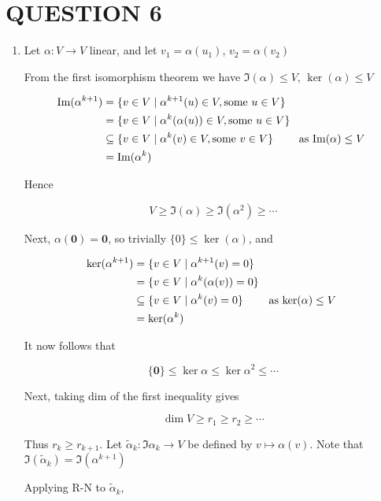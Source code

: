 \documentclass[a4paper]{article}
\begin{document}
	
	\section{QUESTION 6}
	
	
\begin{enumerate}
	\item Let $ \alpha : V \to V $ linear, and let $ v_{1} = \alpha(u_{1}) $, $ v_{2} = \alpha(v_{2}) $

From the first isomorphism theorem we have $ \Im(\alpha) \leq V $,
$ \ker	(\alpha) \leq V $


\begin{align*}
\Im (\alpha^{k+1}) & = \{  v \in V \; | \; \alpha^{k+1}(u) \in V, \text{some } u \in V \} \\
& = \{  v \in V \; | \; \alpha^{k}(\alpha(u)) \in V, \text{some } u \in V \}\\
& \subseteq \{  v \in V \; | \; \alpha^{k}(v) \in V, \text{some } v \in V \}  \qquad \text{ as $ \Im(\alpha) \leq V $ } \\
& = \Im(\alpha^{k})
\end{align*}

Hence

\[ V \geq \Im (\alpha) \geq \Im (\alpha^{2}) \geq \cdots \]

Next, $ \alpha(\mathbf{0}) = \mathbf{0} $, so trivially $ \{ 0 \} \leq \ker(\alpha) $, and

\begin{align*}
\ker (\alpha^{k+1}) & = \{  v \in V \; | \; \alpha^{k+1}(v) =0\} \\
& = \{  v \in V \; | \; \alpha^{k}(\alpha(v)) =0 \}\\
& \subseteq \{  v \in V \; | \; \alpha^{k}(v) =0 \}  \qquad \text{ as $ \ker(\alpha) \leq V $ } \\
& = \ker(\alpha^{k})
\end{align*}

It now follows that

\[ \{ \mathbf{0} \} \leq \ker \alpha \leq \ker \alpha^{2} \leq \cdots \]

Next, taking dim of the first inequality gives

\[ \dim V \geq r_{1} \geq r_{2} \geq \cdots  \]
	
Thus $ r_{k} \geq r_{k+1} $. 
Let $ \widetilde{\alpha}_{k} : \Im \alpha_{k} \to V $ be defined by $ v \mapsto \alpha(v) $. Note that $ \Im(\widetilde{\alpha}_{k}) = \Im(\alpha^{k+1}) $

Applying R-N to $ \widetilde{\alpha}_{k} $,


\end{enumerate}
\end{document}
